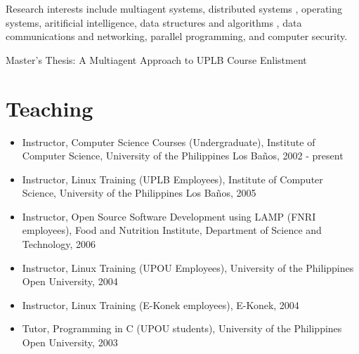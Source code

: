 \documentclass[overlapped,line,letterpaper]{res}
\begin{document}
\begin{resume}
Research interests include multiagent systems, distributed systems
, operating systems, aritificial intelligence, data structures and algorithms
, data communications and networking, parallel programming, and computer security.

Master's Thesis: A Multiagent Approach to UPLB Course Enlistment


\section{\bf Teaching}

\begin{itemize}
\item Instructor, Computer Science Courses (Undergraduate),
Institute of Computer Science, University of the Philippines Los Ba\~{n}os, 2002 - present
\item Instructor, Linux Training (UPLB Employees), 
Institute of Computer Science, University of the Philippines Los Ba\~{n}os, 2005
\item Instructor, Open Source Software Development using LAMP (FNRI employees), 
Food and Nutrition Institute, Department of Science and Technology, 2006
\item Instructor, Linux Training (UPOU Employees), 
University of the Philippines Open University, 2004
\item Instructor, Linux Training (E-Konek employees), 
E-Konek, 2004
\item Tutor, Programming in C (UPOU students), 
University of the Philippines Open University, 2003
\end{itemize}


%
%


\end{resume}
\end{document}
